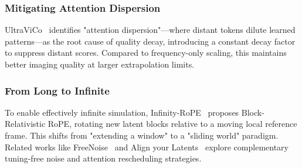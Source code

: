 \documentclass[lettersize,journal]{IEEEtran}
\begin{document}
\subsubsection{Mitigating Attention Dispersion}
UltraViCo~\cite{zhao2025ultravico} identifies "attention dispersion"—where distant tokens dilute learned patterns—as the root cause of quality decay, introducing a constant decay factor to suppress distant scores. Compared to frequency-only scaling, this maintains better imaging quality at larger extrapolation limits.
\subsubsection{From Long to Infinite}
To enable effectively infinite simulation, Infinity-RoPE~\cite{yesiltepe2025infinity} proposes Block-Relativistic RoPE, rotating new latent blocks relative to a moving local reference frame. This shifts from "extending a window" to a "sliding world" paradigm.
Related works like FreeNoise~\cite{qiu2024freenoise} and Align your Latents~\cite{blattmann2023align} explore complementary tuning-free noise and attention rescheduling strategies.






\end{document}
